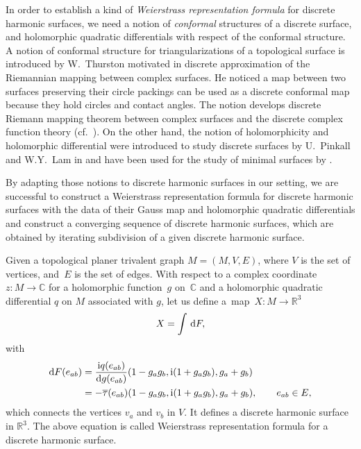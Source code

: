 \documentclass[pdftex]{sigma}
\newcommand{\R}{\mathbb{R}}
\newcommand{\C}{\mathbb{C}}
\newcommand{\ii}{{\mathrm{i}}}
\let\Re\relax
\DeclareMathOperator{\Re}{Re}
\let\Re\relax
\DeclareMathOperator{\Re}{{\mathrm Re}}
\newcommand{\1}{{\bf 1}}
\numberwithin{equation}{section}
\begin{document}
In order to establish a kind of {\em Weierstrass representation formula} for discrete harmonic surfaces,
we need a notion of {\em conformal} structures of a discrete surface,
and holomorphic quadratic differentials with respect of the conformal structure.
A notion of conformal structure for triangularizations of a topological surface is introduced by
W.~Thurston \cite{thurston} motivated in discrete approximation of the Riemannian mapping between complex surfaces.
He noticed a map between two surfaces preserving their circle packings can be used as a discrete conformal map
because they hold circles and contact angles.
The notion develops discrete Riemann mapping theorem \cite{rodin-sullivan} between complex surfaces
and the discrete complex function theory (cf.\ \cite{circle-packing}).
On the other hand, the notion of holomorphicity and holomorphic differential were introduced to study discrete surfaces
by U.~Pinkall and W.Y.~Lam in \cite{lam-pinkall} and have been used for the study of minimal surfaces by \cite{lam, lam2}.

By adapting those notions to discrete harmonic surfaces in our setting,
we are successful to construct a Weierstrass representation formula for discrete harmonic surfaces with the data of their Gauss map and holomorphic quadratic differentials and construct a converging sequence of discrete harmonic surfaces, which are obtained by iterating subdivision of a given discrete harmonic surface.

\begin{theorem*}
 Given a topological planer trivalent graph $M=(M,V,E)$, where $V$ is the set of vertices, and~$E$ is the set of edges.
 With respect to a complex coordinate $z\colon M \to \C$ for a holomorphic function~$g$ on~$\C$
 and a holomorphic quadratic differential $q$ on $M$ associated with $g$,
 let us define a~map~${X\colon M \to \R^3}$
 \begin{displaymath}
 X = \int \Re\, {\rm d}F,
 \end{displaymath}
 with
 \begin{align}
 {\rm d}F(e_{ab}) &= \frac{\ii q(e_{ab})}{{\rm d}g(e_{ab})}(1-g_ag_b, \ii(1+g_ag_b), g_a+g_b)\nonumber\\
 &=-\overline{\tau}(e_{ab}) (1-g_ag_b, \ii(1+g_ag_b), g_a+g_b), \qquad e_{ab} \in E,\label{eq:weierstrass}
 \end{align}
which connects the vertices $v_a$ and $v_b$ in $V$. It defines a discrete harmonic surface in $\R^3$.
 The above equation is called Weierstrass representation formula for a discrete harmonic surface.
\end{theorem*}
\end{document}
